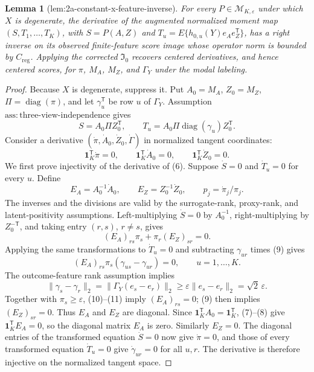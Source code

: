 \documentclass{article}
\newtheorem{lemma}{Lemma}
\begin{document}
\begin{lemma}[lem:2a-constant-x-feature-inverse]\label{lem:2a-constant-x-feature-inverse}
For every \(P\in\mathcal M_{K,\varepsilon}\) under which \(X\) is degenerate, the derivative of the augmented normalized moment map \((S,T_1,\ldots,T_K)\), with \(S=P(A,Z)\) and \(T_u=E\{h_{0,u}(Y)e_Ae_Z^{\mathsf T}\}\), has a right inverse on its observed finite-feature score image whose operator norm is bounded by \(C_{\mathrm{reg}}\).  Applying the corrected \(\mathfrak I_0\) recovers centered derivatives, and hence centered scores, for \(\pi\), \(M_A\), \(M_Z\), and \(\Gamma_Y\) under the modal labeling.
\end{lemma}
\begin{proof}
Because \(X\) is degenerate, suppress it.  Put \(A_0=M_A\), \(Z_0=M_Z\), \(\Pi=\operatorname{diag}(\pi)\), and let \(\gamma_u^{\mathsf T}\) be row \(u\) of \(\Gamma_Y\).  Assumption \(\mathrm{ass{:}three\mbox{-}view\mbox{-}independence}\) gives
\[
 S=A_0\Pi Z_0^{\mathsf T},\qquad
 T_u=A_0\Pi\operatorname{diag}(\gamma_u)Z_0^{\mathsf T}. \tag{6}
\]
Consider a derivative \((\dot\pi,\dot A_0,\dot Z_0,\dot\Gamma)\) in normalized tangent coordinates:
\[
 \mathbf 1_K^{\mathsf T}\dot\pi=0,\qquad
 \mathbf 1_K^{\mathsf T}\dot A_0=0,\qquad
 \mathbf 1_K^{\mathsf T}\dot Z_0=0. \tag{7}
\]
We first prove injectivity of the derivative of (6).  Suppose \(\dot S=0\) and \(\dot T_u=0\) for every \(u\).  Define
\[
 E_A=A_0^{-1}\dot A_0,\qquad E_Z=Z_0^{-1}\dot Z_0,
 \qquad p_j=\dot\pi_j/\pi_j. \tag{8}
\]
The inverses and the divisions are valid by the surrogate-rank, proxy-rank, and latent-positivity assumptions.  Left-multiplying \(\dot S=0\) by \(A_0^{-1}\), right-multiplying by \(Z_0^{-\mathsf T}\), and taking entry \((r,s)\), \(r\ne s\), gives
\[
 (E_A)_{rs}\pi_s+\pi_r(E_Z)_{sr}=0. \tag{9}
\]
Applying the same transformations to \(\dot T_u=0\) and subtracting \(\gamma_{ur}\) times (9) gives
\[
 (E_A)_{rs}\pi_s(\gamma_{us}-\gamma_{ur})=0,
 \qquad u=1,\ldots,K. \tag{10}
\]
The outcome-feature rank assumption implies
\[
 \|\gamma_s-\gamma_r\|_2
 =\|\Gamma_Y(e_s-e_r)\|_2
 \geq\varepsilon\|e_s-e_r\|_2=\sqrt 2\,\varepsilon. \tag{11}
\]
Together with \(\pi_s\geq\varepsilon\), (10)--(11) imply \((E_A)_{rs}=0\); (9) then implies \((E_Z)_{sr}=0\).  Thus \(E_A\) and \(E_Z\) are diagonal.  Since \(\mathbf 1_K^{\mathsf T}A_0=\mathbf 1_K^{\mathsf T}\), (7)--(8) give \(\mathbf 1_K^{\mathsf T}E_A=0\), so the diagonal matrix \(E_A\) is zero.  Similarly \(E_Z=0\).  The diagonal entries of the transformed equation \(\dot S=0\) now give \(\dot\pi=0\), and those of every transformed equation \(\dot T_u=0\) give \(\dot\gamma_{ur}=0\) for all \(u,r\).  The derivative is therefore injective on the normalized tangent space.


\end{proof}
\end{document}
